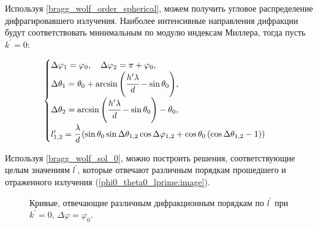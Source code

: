 
Используя \autoref{bragg_wolf_order_spherical}, можем получить угловое распределение дифрагировавшего излучения. Наиболее интенсивные направления дифракции будут соответствовать минимальным по модулю индексам Миллера, тогда пусть $k^\prime = 0$:

    \begin{equation}
        \begin{cases}
            \Delta \varphi_1 = \varphi_0, \quad \Delta \varphi_2 = \pi + \varphi_0,
            \\
            \Delta \theta_1 = \theta_0 + \arcsin{\left( \cfrac{h^{\prime} \lambda}{d} - \sin{\theta_0} \right)},
            \\
            \Delta \theta_2 = \arcsin{\left( \cfrac{h^{\prime} \lambda}{d} - \sin{\theta_0} \right)} - \theta_0,
            \\
            l^{\prime}_{1,2} = \cfrac{\lambda}{d}\left(\sin{\theta_0}\sin{\Delta \theta_{1,2}}\cos{\Delta \varphi_{1,2}} + \cos{\theta_0} \left( \cos{\Delta \theta_{1,2}} - 1 \right)\right)
        \end{cases}
        \label{bragg_wolf_sol_0}
    \end{equation}

Используя \autoref{bragg_wolf_sol_0}, можно построить решения, соответствующие целым значениям $l^\prime$, которые отвечают различным порядкам прошедшего и отраженного излучения (\autoref{phi0_theta0_lprime:image}).

    \begin{figure}[ht]
        \hfil
        \caption{Кривые, отвечающие различным дифракционным порядкам по $l^\prime$ при $k^\prime = 0$, $\Delta \varphi = \varphi_0$.}\label{phi0_theta0_lprime:image}
    \end{figure}

